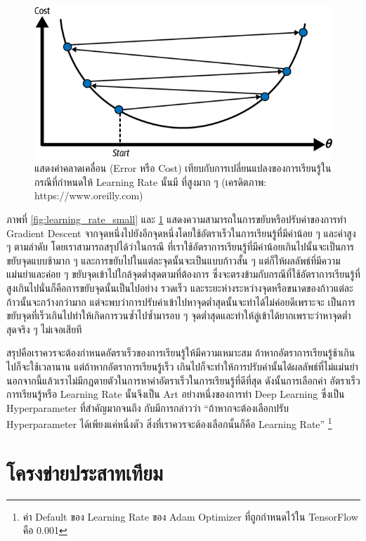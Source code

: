 \begin{figure}[H]
    \centering
    \includegraphics[width=0.8\linewidth]{fig/learning_rate_high.png}
    \caption{แสดงค่าคลาดเคลื่อน (Error หรือ Cost) เทียบกับการเปลี่ยนแปลงของการเรียนรู้ในกรณีที่กำหนดให้ Learning Rate นั้นมี%
        ที่สูงมาก ๆ (เครดิตภาพ: https://www.oreilly.com)}
    \label{fig:learning_rate_high}
\end{figure}

ภาพที่ \ref{fig:learning_rate_small} และ \ref{fig:learning_rate_high} แสดงความสามารถในการขยับหรือปรับค่าของการทำ
Gradient Descent จากจุดหนึ่งไปยังอีกจุดหนึ่งโดยใช้อัตราเร็วในการเรียนรู้ที่มีค่าน้อย ๆ และค่าสูง ๆ ตามลำดับ โดยเราสามารถสรุปได้ว่าในกรณี%
ที่เราใช้อัตราการเรียนรู้ที่มีค่าน้อยเกินไปนั้นจะเป็นการขยับจุดแบบช้ามาก ๆ และการขยับไปในแต่ละจุดนั้นจะเป็นแบบก้าวสั้น ๆ แต่ก็ให้ผลลัพธ์ที่มีความ%
แม่นยำและค่อย ๆ ขยับจุดเข้าไปใกล้จุดต่ำสุดตามที่ต้องการ ซึ่งจะตรงข้ามกับกรณีที่ใช้อัตราการเรียนรู้ที่สูงเกินไปนั่นก็คือการขยับจุดนั้นเป็นไปอย่าง%
รวดเร็ว และระยะห่างระหว่างจุดหรือขนาดของก้าวแต่ละก้าวนั้นจะกว้างกว่ามาก แต่จะพบว่าการปรับค่าเข้าไปหาจุดต่ำสุดนั้นจะทำได้ไม่ค่อยดีเพราะจะ%
เป็นการขยับจุดที่เร็วเกินไปทำให้เกิดการวนซ้ำไปซ้ำมารอบ ๆ จุดต่ำสุดและทำให้ลู่เข้าได้ยากเพราะว่าหาจุดต่ำสุดจริง ๆ ไม่เจอเสียที

สรุปคือเราควรจะต้องกำหนดอัตราเร็วของการเรียนรู้ให้มีความเหมาะสม ถ้าหากอัตราการเรียนรู้ช้าเกินไปก็จะใช้เวลานาน แต่ถ้าหากอัตราการเรียนรู้เร็ว%
เกินไปก็จะทำให้การปรับค่านั้นได้ผลลัพธ์ที่ไม่แม่นยำ นอกจากนี้แล้วเราไม่มีกฎตายตัวในการหาค่าอัตราเร็วในการเรียนรู้ที่ดีที่สุด ดังนั้นการเลือกค่า%
อัตราเร็วการเรียนรู้หรือ Learning Rate นั้นจึงเป็น Art อย่างหนึ่งของการทำ Deep Learning ซึ่งเป็น Hyperparameter ที่สำคัญมากจนถึง%
กับมีการกล่าวว่า \enquote{ถ้าหากจะต้องเลือกปรับ Hyperparameter ได้เพียงแค่หนึ่งตัว สิ่งที่เราควรจะต้องเลือกนั้นก็คือ Learning Rate}%
\footnote{ค่า Default ของ Learning Rate ของ Adam Optimizer ที่ถูกกำหนดไว้ใน TensorFlow คือ 0.001}

\section{โครงข่ายประสาทเทียม}
\label{sec:nn}

